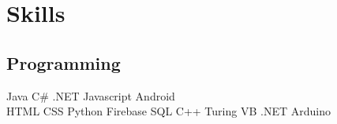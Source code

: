 \documentclass[]{deedy-resume-openfont}
\begin{document}
\begin{minipage}[t]{0.33\textwidth}
\sectionsep





\section{Skills}
\subsection{Programming}
Java \textbullet{} C\# .NET \textbullet{} Javascript \textbullet{} Android \\  %
\vspace{1mm}
HTML  \textbullet{} CSS \textbullet{}  Python \textbullet{}  Firebase \textbullet{} SQL  C++ \textbullet{} Turing \textbullet{} VB .NET \textbullet{} Arduino \\ 
\vspace{1mm}
\sectionsep


\end{minipage}
\end{document}
